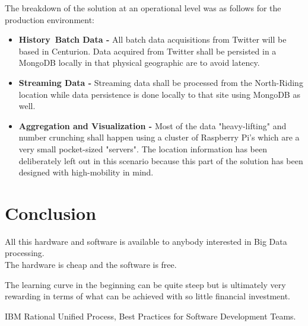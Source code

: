 \documentclass[12pt]{article} %
\begin{document}
	The breakdown of the solution at an operational level was as follows for the production environment:
	
	\begin{itemize}
		\item \textbf{History\ Batch Data -} All batch data acquisitions from Twitter will be based in Centurion. Data acquired from Twitter shall be persisted in a MongoDB locally in that physical geographic are to avoid latency.
		\item \textbf{Streaming Data -} Streaming data shall be processed from the North-Riding location while data persistence is done locally to that site using MongoDB as well.
		\item \textbf{Aggregation and Visualization -} Most of the data "heavy-lifting" and number crunching shall happen using a cluster of Raspberry Pi's which are a very small pocket-sized "servers". The location information has been deliberately left out in this scenario because this part of the solution has been designed with high-mobility in mind.
	\end{itemize}
	
	
	\section{Conclusion} %
	
	All this hardware and software is available to anybody interested in Big Data processing.\\
	
	The hardware is cheap and the software is free.\
	
	The learning curve in the beginning can be quite steep but is ultimately very rewarding in terms of what can be achieved with so little financial investment.
	
	
	
	
	\newpage
	
	
	\begin{thebibliography}{99} %
		
		 IBM Rational Unified Process, Best Practices for Software Development Teams.

	\end{thebibliography}
	
\end{document}
